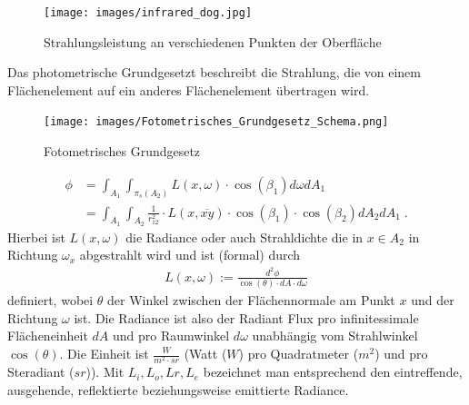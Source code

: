  \begin{figure}[H]
    \centering
    \texttt{[image: images/infrared\_dog.jpg]}
    \caption{Strahlungsleistung an verschiedenen Punkten der Oberfläche}
    \label{fig:cray}
\end{figure}


\begin{Satz}

Das  photometrische Grundgesetzt beschreibt die Strahlung, die von einem  Flächenelement auf ein anderes  Flächenelement 
übertragen wird.  
 \begin{figure}[H]
    \centering
    \texttt{[image: images/Fotometrisches\_Grundgesetz\_Schema.png]}
    \caption{Fotometrisches Grundgesetz}
    \label{fig:cray}
\end{figure}

\begin{align}
\phi &= \int_{A_1} \int_{\pi_s(A_2)} L(x, \omega)\cdot \cos(\beta_1) d\omega  dA_1  \\
&= \int_{A_1} \int_{A_2} \frac{1}{r_{12}^2}  \cdot L(x, \overline{xy}) \cdot \cos(\beta_1) \cdot \cos(\beta_2)  d A_2 dA_1 \; .
\end{align}
Hierbei ist $L(x, \omega)$   die Radiance oder auch Strahldichte die in $x \in A_2$ in Richtung $\omega_x$ abgestrahlt wird und ist (formal) durch  
\begin{align}
L(x, \omega) := \frac{d^2 \phi}{\cos(\theta) \cdot dA \cdot d\omega} 
\end{align}
definiert, wobei $\theta$ der Winkel zwischen der Flächennormale am Punkt $x$ und der Richtung $\omega$ ist.
Die Radiance ist also der Radiant Flux pro infinitessimale Flächeneinheit $dA$ und pro  Raumwinkel $d \omega$ unabhängig vom Strahlwinkel $\cos(\theta)$.
Die Einheit ist $\frac{W}{m^2\cdot sr}$ (Watt ($W$) pro Quadratmeter ($m^2$) und pro Steradiant ($sr$)). 
Mit $L_i, L_o,Lr,L_e$ bezeichnet man entsprechend den eintreffende, ausgehende, reflektierte beziehungsweise emittierte Radiance.
\end{Satz}

